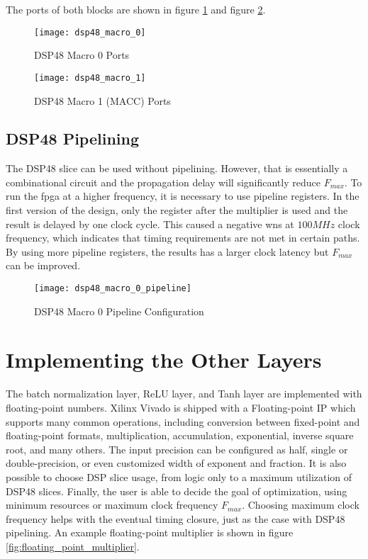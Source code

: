 The ports of both blocks are shown in figure \ref{fig:dsp48_macro_0} and figure \ref{fig:dsp48_macro_1}.

\begin{figure}[h]
  \centering
  \texttt{[image: dsp48\_macro\_0]}
  \caption{DSP48 Macro 0 Ports}
  \label{fig:dsp48_macro_0}
\end{figure}

\begin{figure}[h]
  \centering
  \texttt{[image: dsp48\_macro\_1]}
  \caption{DSP48 Macro 1 (MACC) Ports}
  \label{fig:dsp48_macro_1}
\end{figure}

\subsection{DSP48 Pipelining}

The DSP48 slice can be used without pipelining. However, that is essentially a combinational circuit and
the propagation delay will significantly reduce $F_{max}$. To run the \gls{fpga} at a higher frequency, it is
necessary to use pipeline registers. In the first version of the design, only the register after the
multiplier is used and the result is delayed by one clock cycle. This caused a negative \gls{wns} at
$100 MHz$ clock frequency, which indicates that timing requirements are not met in certain paths. By
using more pipeline registers, the results has a larger clock latency but $F_{max}$ can be improved.

\begin{figure}[h]
  \centering
  \texttt{[image: dsp48\_macro\_0\_pipeline]}
  \caption{DSP48 Macro 0 Pipeline Configuration}
  \label{fig:dsp48_macro_0_pipeline}
\end{figure}

\section{Implementing the Other Layers}

The batch normalization layer, ReLU layer, and Tanh layer are implemented with floating-point numbers.
Xilinx Vivado is shipped with a Floating-point IP which supports many common operations, including
conversion between fixed-point and floating-point formats, multiplication, accumulation, exponential,
inverse square root, and many others. The input precision can be configured as half, single or
double-precision, or even customized width of exponent and fraction. It is also possible to choose
DSP slice usage, from logic only to a maximum utilization of DSP48 slices. Finally, the user is able to decide
the goal of optimization, using minimum resources or maximum clock frequency $F_{max}$. Choosing maximum
clock frequency helps with the eventual timing closure, just as the case with DSP48 pipelining. An example
floating-point multiplier is shown in figure \ref{fig:floating_point_multiplier}.

